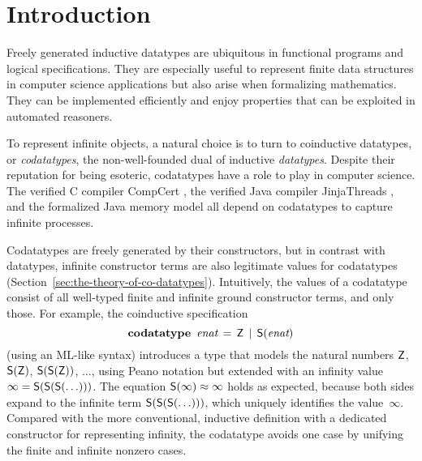 \setcounter{footnote}{0}

\section{Introduction}
\label{sec:introduction}

Freely generated inductive datatypes are ubiquitous in functional programs and
logical specifications. They are especially
useful to represent finite data structures in computer science applications but
also arise when formalizing mathematics.
They can be implemented efficiently and enjoy
properties that can be exploited in automated reasoners.
%

To represent infinite objects, %
a natural choice is to turn to coinductive datatypes, or \emph{codatatypes},
the non-well-founded dual of inductive \emph{datatypes}.
%
Despite their reputation for being esoteric, codatatypes have a
role to play in computer science. The verified C compiler CompCert
\cite{leroy-2009}, the verified Java compiler Jinja\-Threads
\cite{lochbihler-2010-jinja}, and the formalized Java memory model
\cite{lochbihler-2014-jmm} all depend on codatatypes to capture infinite
processes.

Codatatypes are freely generated by their constructors, but in contrast with datatypes,
infinit\-e constructor terms are also legitimate values for codatatypes
(Section~\ref{sec:the-theory-of-co-datatypes}). Intuitively, the
values of a codatatype consist of all well-typed finite and infinite ground
constructor
terms, and only those. For example, the coinductive specification
%
\[\textbf{codatatype}~\,\textit{enat} \,=\, \textsf{Z} \,\mid\, \textsf{S}(\textit{enat})\]
%
(using an ML-like syntax) introduces a type that
models the natural numbers $\textsf{Z}$, $\textsf{S}(\textsf{Z})$, $\textsf{S}(\textsf{S}(\textsf{Z}))$, $\ldots$\afterLdots{},
using Peano notation but extended with an
infinity value $\infty = \textsf{S}(\textsf{S}(\textsf{S}(\ldots)))$.
The equation $\textsf{S}(\infty) \approx \infty$ holds as expected,
because both sides expand to the infinite term
$\textsf{S}(\textsf{S}(\textsf{S}(\ldots)))$, which uniquely identifies the
value~$\infty$.
Compared
with the more conventional, inductive definition with a dedicated constructor
for representing infinity,
%
the codatatype avoids one case by unifying the finite and infinite nonzero cases.

